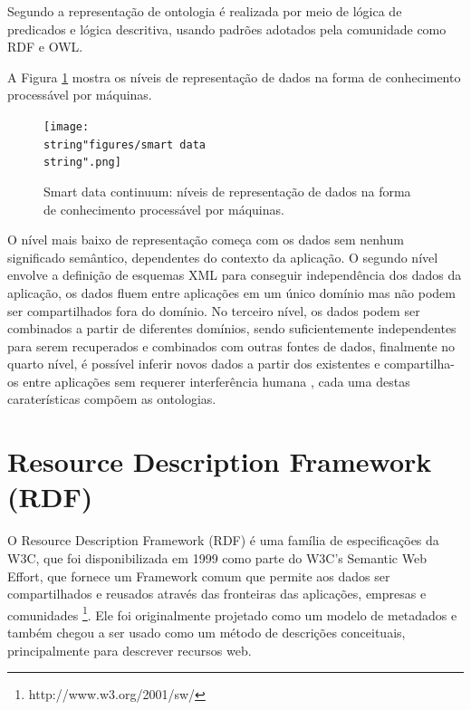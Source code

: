 Segundo \citet{Patel-schneider05buildingthe} a representação de ontologia
é realizada por meio de lógica de predicados e lógica descritiva,
usando padrões adotados pela comunidade como \foreignlanguage{english}{RDF}
e \foreignlanguage{english}{OWL}.

A Figura \ref{fig:Smart-data-continuum} mostra os níveis de representação
de dados na forma de conhecimento processável por máquinas.

\begin{figure}[H]
\centering{}\texttt{[image: \\string"figures/smart data\\string".png]}\caption{\foreignlanguage{english}{Smart data continuum\foreignlanguage{brazil}{: níveis de representação
de dados na forma de conhecimento processável por máquinas.\label{fig:Smart-data-continuum}}}}
\end{figure}

O nível mais baixo de representação começa com os dados sem nenhum
significado semântico, dependentes do contexto da aplicação. O segundo
nível envolve a definição de esquemas \foreignlanguage{english}{XML}
para conseguir independência dos dados da aplicação, os dados fluem
entre aplicações em um único domínio mas não podem ser compartilhados
fora do domínio. No terceiro nível, os dados podem ser combinados
a partir de diferentes domínios, sendo suficientemente independentes
para serem recuperados e combinados com outras fontes de dados, finalmente
no quarto nível, é possível inferir novos dados a partir dos existentes
e compartilha-os entre aplicações sem requerer interferência humana
\citep{sugumaran2011}, cada uma destas caraterísticas compõem as
ontologias.
%

\section{Resource Description Framework\foreignlanguage{brazil}{ (}RDF\foreignlanguage{brazil}{)}}

%
O \foreignlanguage{english}{Resource Description Framework (RDF)}
é uma família de especificações da W3C, que foi disponibilizada em
1999 como parte do W3C's \foreignlanguage{english}{Semantic Web Effort},
que fornece um \foreignlanguage{english}{Framework} comum que permite
aos dados ser compartilhados e reusados através das fronteiras das
aplicações, empresas e comunidades \footnote{http://www.w3.org/2001/sw/}.
Ele foi originalmente projetado como um modelo de metadados e também
chegou a ser usado como um método de descrições conceituais, principalmente
para descrever recursos web. 


